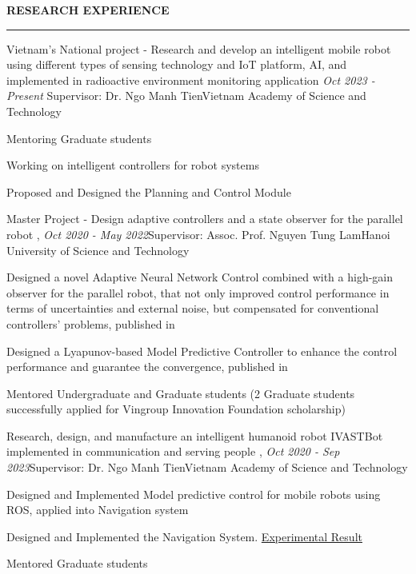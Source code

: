 \documentclass{resume} %
\renewenvironment{rSection}[1]{
\sectionskip
\textbf{\MakeUppercase{{#1}}}
\sectionlineskip
\hrule
\begin{list}{}{
\setlength{\leftmargin}{1.5em}
}
\item[]
}{
\end{list}
}
\begin{document}
\begin{rSection}{Research Experience}
\begin{rSubsection}{Vietnam’s National project - Research and develop an intelligent mobile robot using different types of sensing technology and IoT platform, AI, and implemented in radioactive environment monitoring application}  {\em Oct 2023 - Present}
{Supervisor: Dr. Ngo Manh Tien}{Vietnam Academy of Science and Technology}
{}
{}
\item Mentoring Graduate students
\item Working on intelligent controllers for robot systems
\item Proposed and Designed the Planning and Control Module
\end{rSubsection}

\begin{rSubsection}{Master Project - Design adaptive controllers and a state observer for the parallel robot  \cite{paper1}, \cite{paper2}}{\em Oct 2020 - May 2022}{Supervisor: Assoc. Prof.  Nguyen Tung Lam}{Hanoi University of Science and Technology}
{}
{}
\item Designed a novel Adaptive Neural Network Control combined with a high-gain observer for the parallel robot, that not only improved control performance in terms of uncertainties and external noise, but compensated for conventional controllers' problems, published in \cite{paper1}
\item Designed a Lyapunov-based Model Predictive Controller to enhance the control performance and guarantee the convergence, published in  \cite{paper2}
\item Mentored Undergraduate and Graduate students (2 Graduate students successfully applied for Vingroup Innovation Foundation scholarship) 
\end{rSubsection}

\begin{rSubsection}{Research, design, and manufacture an intelligent humanoid robot IVASTBot implemented in communication and serving people \cite{paper3}, \cite{paper4}}{\em Oct 2020 - Sep 2023}{Supervisor: Dr.  Ngo Manh Tien}{Vietnam Academy of Science and Technology}
{}
{}
\item Designed and Implemented Model predictive control for mobile robots using ROS, applied into Navigation system
\item Designed and Implemented the Navigation System. \href{https://www.youtube.com/watch?v=kqwyAnCO3dc&ab_channel=ManhCuongNguyen}{Experimental Result}
\item Mentored Graduate students
\end{rSubsection}


\end{rSection}
\end{document}
